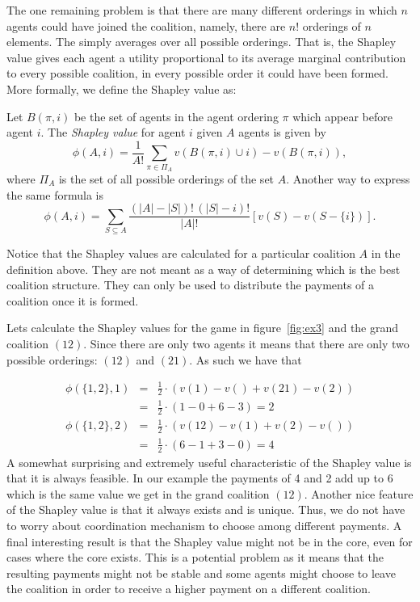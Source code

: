 The one remaining problem is that there are many different orderings
in which $n$ agents could have joined the coalition, namely, there are
$n!$ orderings of $n$ elements. The  simply averages
over all possible orderings. That is, the Shapley value gives each
agent a utility proportional to its average marginal contribution to
every possible coalition, in every possible order it could have been
formed. More formally, we define the Shapley value as:

\begin{definition}
  Let $B(\pi,i)$ be the set of agents in the agent ordering $\pi$
  which appear before agent $i$. The \emph{Shapley value} for agent $i$
  given $A$ agents is given by
  \[ \phi(A,i) = \frac{1}{A!} \sum_{\pi \in \Pi_A} v(B(\pi,i) \cup i) -
  v(B(\pi,i)), \]
  where $\Pi_A$ is the set of all possible orderings of the set
  $A$. Another way to express the same formula is 
  \[ \phi(A,i) = \sum_{S\subseteq A} \frac{(|A|-|S|)! \,(|S| - i)!}{|A|!}
  [v(S) - v(S - \{i\})].\]
\end{definition}

Notice that the Shapley values are calculated for a particular
coalition $A$ in the definition above. They are not meant as a way of
determining which is the best coalition structure. They can only be
used to distribute the payments of a coalition once it is formed.

Lets calculate the Shapley values for the game in figure~\ref{fig:ex3}
and the grand coalition $(12)$. Since there are only two agents it
means that there are only two possible orderings: $(12)$ and $(21)$.
As such we have that

\begin{eqnarray*}
  \phi(\{1,2\}, 1) &=&\frac{1}{2}\cdot \left( v(1) - v() + v(21) -
    v(2)\right)\\
  &=&\frac{1}{2}\cdot( 1 - 0 + 6 - 3) = 2 \\
  \phi(\{1,2\}, 2) &=&\frac{1}{2}\cdot \left( v(12) - v(1) + v(2) -
    v()\right)\\
  &=&\frac{1}{2}\cdot( 6 - 1 + 3 - 0) = 4
\end{eqnarray*}
A somewhat surprising and extremely useful characteristic of the
Shapley value is that it is always feasible. In our example the
payments of 4 and 2 add up to 6 which is the same value we get in the
grand coalition $(12)$.  Another nice feature of the Shapley value is
that it always exists and is unique. Thus, we do not have to worry
about coordination mechanism to choose among different payments. A
final interesting result is that the Shapley value might not be in the
core, even for cases where the core exists. This is a potential
problem as it means that the resulting payments might not be stable
and some agents might choose to leave the coalition in order to
receive a higher payment on a different coalition.

